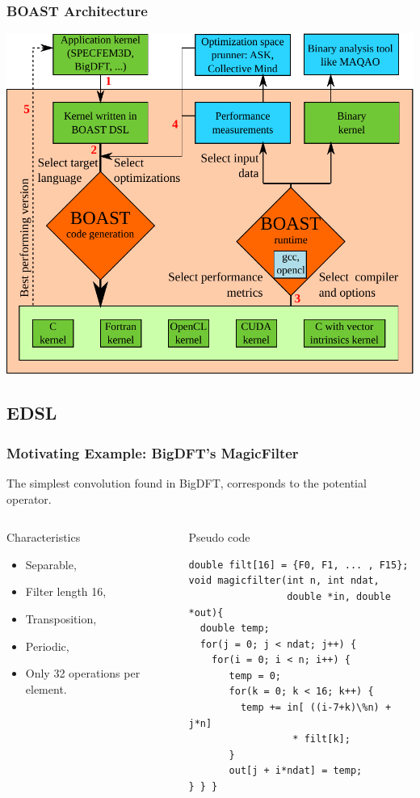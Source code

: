 \documentclass{beamer}
\begin{document}
\begin{frame}
\frametitle{BOAST Architecture}
 \begin{center}
   \includegraphics[scale=0.5]{BOAST_Workflow}
 \end{center}
\end{frame}

\subsection{EDSL}

\begin{frame}[fragile]
\frametitle{Motivating Example: BigDFT's MagicFilter}
The simplest convolution found in BigDFT, corresponds to the potential operator.
\begin{columns}
\column{4cm}
\begin{block}{Characteristics}
\begin{itemize}
\item Separable,
\item Filter length 16,
\item Transposition,
\item Periodic,
\item Only 32 operations per element.
\end{itemize}
\end{block}
\column{6.2cm}
\begin{block}{Pseudo code}
\lstset{style=BC}
\begin{lstlisting}
double filt[16] = {F0, F1, ... , F15};
void magicfilter(int n, int ndat, 
                 double *in, double *out){
  double temp;
  for(j = 0; j < ndat; j++) {
    for(i = 0; i < n; i++) {
       temp = 0;
       for(k = 0; k < 16; k++) {
         temp += in[ ((i-7+k)\%n) + j*n] 
                  * filt[k];
       }
       out[j + i*ndat] = temp;
} } }
\end{lstlisting}
\end{block}
\end{columns}
\end{frame}
\end{document}
